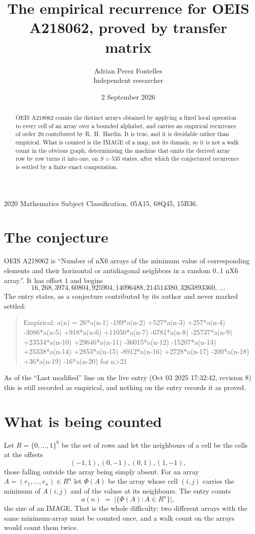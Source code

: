 \documentclass[11pt,a4paper]{article}
\title{The empirical recurrence for OEIS A218062, proved by transfer matrix}
\author{Adrian Perez Fontelles\\ \small Independent researcher}
\date{2 September 2026}
\theoremstyle{plain}
\theoremstyle{definition}
\begin{document}
\maketitle

\begin{abstract}
OEIS A218062 counts the distinct arrays obtained by applying a fixed local operation to every cell
of an array over a bounded alphabet, and carries an empirical recurrence of order $20$
contributed by R.~H.~Hardin. It is true, and it is decidable rather than empirical. What is
counted is the IMAGE of a map, not its domain, so it is not a walk count in the obvious graph;
determinising the machine that emits the derived array row by row turns it into one, on
$S=535$ states, after which the conjectured recurrence is settled by a finite exact
computation.
\end{abstract}

\noindent\small 2020 Mathematics Subject Classification. 05A15, 68Q45, 15B36.\normalsize

\section{The conjecture}

OEIS A218062 is ``Number of nX6 arrays of the minimum value of corresponding elements and their horizontal or antidiagonal neighbors in a random 0..1 nX6 array.''. It has offset $1$ and begins
\[
16, 268, 3974, 60804, 925904, 14096488, 214514380, 3263893360,\ \dots
\]
The entry states, as a conjecture contributed by its author and never marked settled:
\begin{quote}
Empirical: a(n) = 26*a(n-1) -199*a(n-2) +527*a(n-3) +257*a(n-4) -3086*a(n-5) +918*a(n-6) +11050*a(n-7) -6781*a(n-8) -25737*a(n-9) +23534*a(n-10) +29646*a(n-11) -36015*a(n-12) -15207*a(n-13) +25338*a(n-14) +2853*a(n-15) -8912*a(n-16) +2728*a(n-17) -200*a(n-18) +36*a(n-19) -16*a(n-20) for n>21
\end{quote}
As of the ``Last modified'' line on the live entry (Oct 03 2025 17:32:42, revision 8) this is still
recorded as empirical, and nothing on the entry records it as proved.

\section{What is being counted}

Let $R=\{0,\dots,1\}^{6}$ be the set of rows and let the neighbours of
a cell be the cells at the offsets
\[
(-1,1), (0,-1), (0,1), (1,-1),
\]
those falling outside the array being simply absent. For an array
$A=(r_1,\dots,r_n)\in R^n$ let $\Phi(A)$ be the array whose cell $(i,j)$ carries the
minimum of $A(i,j)$ and of the values at its neighbours. The entry counts
\[
a(n)\;=\;\bigl|\{\Phi(A):A\in R^n\}\bigr| ,
\]
the size of an IMAGE. That is the whole difficulty: two different arrays with the same
minimum-array must be counted once, and a walk count on the arrays would count them twice.
\end{document}
